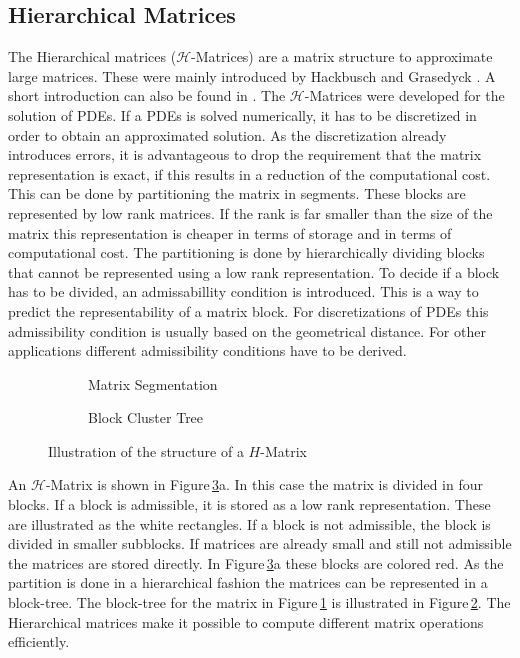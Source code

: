 \documentclass[doctype=mastersthesis,BCOR=15mm,biblatex]{ldvbook}%
\begin{document}
\subsection{Hierarchical Matrices}\label{subsec:H-mat}
The Hierarchical matrices ($\mathcal{H}$-Matrices) are a matrix structure to approximate large matrices. These were mainly introduced by Hackbusch \cite{hackbusch_hierarchische_2009} and Grasedyck \cite{grasedyck_theorie_2001}.
A short introduction can also be found in \cite{grasedyck_adaptive_2004}.
The $\mathcal{H}$-Matrices were developed for the solution of PDEs.
If a PDEs is solved numerically, it has to be discretized in order to obtain an approximated solution.
As the discretization already introduces errors, it is advantageous to drop the requirement that the matrix representation is exact, if this results in a reduction of the computational cost.
This can be done by partitioning the matrix in segments. These blocks are represented by low rank matrices. If the rank is far smaller than the size of the matrix this representation is cheaper in terms of storage and in terms of computational cost.
The partitioning is done by hierarchically dividing blocks that cannot be represented using a low rank representation.
To decide if a block has to be divided, an admissabillity condition is introduced.
This is a way to predict the representability of a matrix block.
For discretizations of PDEs this admissibility condition is usually based on the geometrical distance.
For other applications different admissibility conditions have to be derived.

\begin{figure}
	\centering
	\begin{subfigure}[b]{0.45\textwidth}
		\centering
		
		\caption{Matrix Segmentation}
		\label{fig:strukturh-matrix_a}
	\end{subfigure}
	\begin{subfigure}[b]{0.45\textwidth}
	\centering
	\resizebox{0.7\textwidth}{!}{
	
	}
	\caption{Block Cluster Tree}
	\label{fig:strukturh-matrix_b}
	\end{subfigure}
	\caption{Illustration of the structure of a $H$-Matrix}
	\label{fig:strukturh-matrix}
\end{figure}


An $\mathcal{H}$-Matrix is shown in Figure\,\ref{fig:strukturh-matrix}a. 
In this case the matrix is divided in four blocks.
If a block is admissible, it is stored as a low rank representation. These are illustrated as the white rectangles.
If a block is not admissible, the block is divided in smaller subblocks.
If matrices are already small and still not admissible the matrices are stored directly. In Figure\,\ref{fig:strukturh-matrix}a these blocks are colored red.
As the partition is done in a hierarchical fashion the matrices can be represented in a block-tree. 
The block-tree for the matrix in Figure\,\ref{fig:strukturh-matrix_a} is illustrated in Figure\,\ref{fig:strukturh-matrix_b}.
The Hierarchical matrices make it possible to compute different matrix operations efficiently. %
\end{document}
